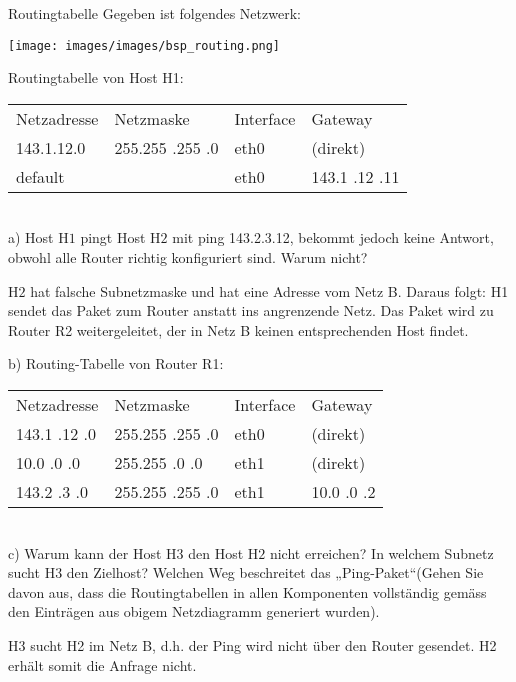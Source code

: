 \begin{example2}{Routingtabelle}
  Gegeben ist folgendes Netzwerk:

  \texttt{[image: images/images/bsp\_routing.png]}

  Routingtabelle von Host H1:

  \begin{tabular}{llll} 
    Netzadresse & Netzmaske & Interface & Gateway \\
    143.1.12.0 & 255.255 .255 .0 & eth0 & (direkt) \\
    default & & eth0 & 143.1 .12 .11
    \end{tabular}\\

    a) Host $\mathrm{H} 1$ pingt Host $\mathrm{H} 2$ mit ping 143.2.3.12, bekommt jedoch keine Antwort, obwohl alle Router richtig konfiguriert sind. Warum nicht? 

$\mathrm{H} 2$ hat falsche Subnetzmaske und hat eine Adresse vom Netz B.
Daraus folgt: H1 sendet das Paket zum Router anstatt ins angrenzende Netz.
Das Paket wird zu Router R2 weitergeleitet, der in Netz B keinen entsprechenden Host findet.

b) Routing-Tabelle von Router R1:

\begin{tabular}{llll} 
Netzadresse & Netzmaske & Interface & Gateway \\
143.1 .12 .0 & 255.255 .255 .0 & eth0 & (direkt) \\
10.0 .0 .0 & 255.255 .0 .0 & eth1 & (direkt) \\
143.2 .3 .0 & 255.255 .255 .0 & eth1 & 10.0 .0 .2
\end{tabular}\\

c) Warum kann der Host $\mathrm{H} 3$ den Host $\mathrm{H} 2$ nicht erreichen? In welchem Subnetz sucht $\mathrm{H} 3$ den Zielhost? Welchen Weg beschreitet das „Ping-Paket“(Gehen Sie davon aus, dass die Routingtabellen in allen Komponenten vollständig gemäss den Einträgen aus obigem Netzdiagramm generiert wurden).

$\mathrm{H} 3$ sucht H2 im Netz B, d.h. der Ping wird nicht über den Router gesendet. H2 erhält somit die Anfrage nicht.
\end{example2}


